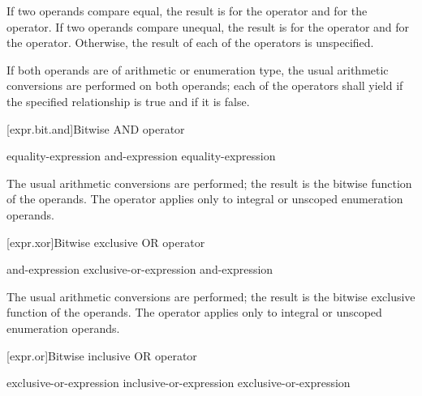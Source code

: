 \pnum
If two operands compare equal, the result is  for
the \tcode{==} operator and  for the \tcode{!=} operator. If two operands
compare unequal, the result is  for the \tcode{==} operator and
 for the \tcode{!=} operator. Otherwise, the result of each of the
operators is unspecified.

\pnum
If both operands are of arithmetic or enumeration type, the usual arithmetic
conversions are performed on both operands; each of the operators shall yield
 if the specified relationship is true and  if it is
false.

[expr.bit.and]{Bitwise AND operator}%
%
%
%
%

\begin{bnf}
\br
    equality-expression\br
    and-expression \terminal{\&} equality-expression
\end{bnf}

\pnum
The usual arithmetic conversions are performed; the result is the
bitwise  function of the operands. The operator
applies only to integral or unscoped enumeration operands.

[expr.xor]{Bitwise exclusive OR operator}%
%
%

\begin{bnf}
\br
    and-expression\br
    exclusive-or-expression \terminal{\caret} and-expression
\end{bnf}

\pnum
The usual arithmetic conversions are performed; the result is the
bitwise exclusive  function of the operands. The
operator applies only to integral or unscoped enumeration operands.

[expr.or]{Bitwise inclusive OR operator}%
%
%

\begin{bnf}
\br
    exclusive-or-expression\br
    inclusive-or-expression \terminal{|} exclusive-or-expression
\end{bnf}

